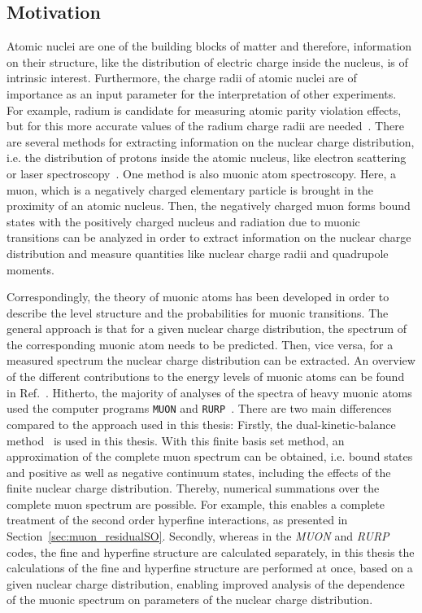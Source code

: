 \subsection{Motivation}
\label{sec:muon_motivation}
Atomic nuclei are one of the building blocks of matter and therefore, information on their structure, like the distribution of electric charge inside the nucleus, is of intrinsic interest. Furthermore, the charge radii of atomic nuclei are of importance as an input parameter for the interpretation of other experiments. For example, radium is candidate for measuring atomic parity violation effects, but for this more accurate values of the radium charge radii are needed~\cite{wansbeek2012}.
There are several methods for extracting information on the nuclear charge distribution, i.e. the distribution of protons inside the atomic nucleus, like electron scattering~\cite{devries1987} or laser spectroscopy~\cite{wang2004,dewitte2007,mueller2007}. One method is also muonic atom spectroscopy. Here, a muon, which is a negatively charged elementary particle is brought in the proximity of an atomic nucleus. Then, the negatively charged muon forms bound states with the positively charged nucleus and radiation due to muonic transitions can be analyzed in order to extract information on the nuclear charge distribution and measure quantities like nuclear charge radii and quadrupole moments.

Correspondingly, the theory of muonic atoms has been developed in order to describe the level structure and the probabilities for muonic transitions. The general approach is that for a given nuclear charge distribution, the spectrum of the corresponding muonic atom needs to be predicted. Then, vice versa, for a measured spectrum the nuclear charge distribution can be extracted. An overview of the different contributions to the energy levels of muonic atoms can be found in Ref.~\cite{BorieRinker1982}. Hitherto, the majority of analyses of the spectra of heavy muonic atoms used the computer programs \texttt{MUON} and \texttt{RURP}~\cite{rinker1979}. There are two main differences compared to the approach used in this thesis:
Firstly, the dual-kinetic-balance method~\cite{Shabaev2004} is used in this thesis. With this finite basis set method, an approximation of the complete muon spectrum can be obtained, i.e. bound states and positive as well as negative continuum states, including the effects of the finite nuclear charge distribution. Thereby, numerical summations over the complete muon spectrum are possible. For example, this enables a complete treatment of the second order hyperfine interactions, as presented in Section~\ref{sec:muon_residualSO}.
Secondly, whereas in the \textit{MUON} and \textit{RURP} codes, the fine and hyperfine structure are calculated separately, in this thesis the calculations of the fine and hyperfine structure are performed at once, based on a given nuclear charge distribution, enabling improved analysis of the dependence of the muonic spectrum on parameters of the nuclear charge distribution.

